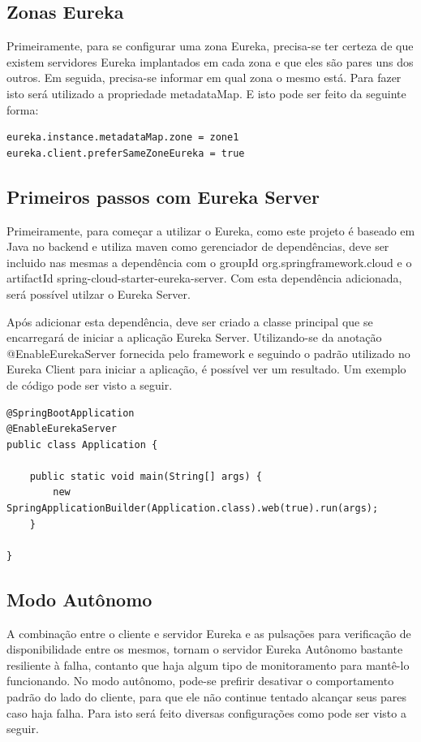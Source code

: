 \subsection{Zonas Eureka}

Primeiramente, para se configurar uma zona Eureka, precisa-se ter certeza de que existem servidores Eureka implantados em cada zona e que eles são pares uns dos outros. Em seguida, precisa-se informar em qual zona o mesmo está. Para fazer isto será utilizado a propriedade metadataMap. E isto pode ser feito da seguinte forma:

\begin{verbatim}
eureka.instance.metadataMap.zone = zone1
eureka.client.preferSameZoneEureka = true
\end{verbatim}

\subsection{Primeiros passos com Eureka Server}

Primeiramente, para começar a utilizar o Eureka, como este projeto é baseado em Java no backend e utiliza maven como gerenciador de dependências, deve ser incluido nas mesmas a dependência com o groupId org.springframework.cloud e o artifactId spring-cloud-starter-eureka-server. Com esta dependência adicionada, será possível utilzar o Eureka Server.

Após adicionar esta dependência, deve ser criado a classe principal que se encarregará de iniciar a aplicação Eureka Server. Utilizando-se da anotação @EnableEurekaServer fornecida pelo framework e seguindo o padrão utilizado no Eureka Client para iniciar a aplicação, é possível ver um resultado. Um exemplo de código pode ser visto a seguir.

\begin{verbatim}
@SpringBootApplication
@EnableEurekaServer
public class Application {

    public static void main(String[] args) {
        new SpringApplicationBuilder(Application.class).web(true).run(args);
    }

}
\end{verbatim}

\subsection{Modo Autônomo}

A combinação entre o cliente e servidor Eureka e as pulsações para verificação de disponibilidade entre os mesmos, tornam o servidor Eureka Autônomo bastante resiliente à falha, contanto que haja algum tipo de monitoramento para mantê-lo funcionando. No modo autônomo, pode-se prefirir desativar o comportamento padrão do lado do cliente, para que ele não continue tentado alcançar seus pares caso haja falha. Para isto será feito diversas configurações como pode ser visto a seguir.


